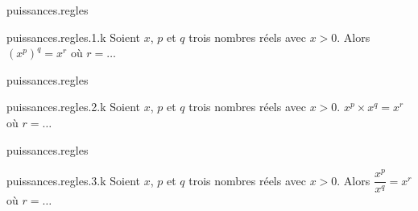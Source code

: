 \begin{qcm}{puissances.regles}
    \begin{question}{puissances.regles.1.k}
         Soient \(x\), \(p\) et \(q\) trois nombres réels avec \(x>0\). Alors \({\left(x^p\right)}^q=x^r\) où \(r=\ldots\)
         \vspace{-1.5ex}
         \begin{multicols}{3}
         \begin{reponses}
              \lastchoices
              
              \phantom{foo}
         \end{reponses}
        \end{multicols}
    \end{question}
\end{qcm}

\begin{qcm}{puissances.regles}
    \begin{question}{puissances.regles.2.k}
         Soient \(x\), \(p\) et \(q\) trois nombres réels avec \(x>0\). \(x^p \times x^q=x^r\) où \(r=\ldots\)
         \vspace{-1.5ex}
         \begin{multicols}{3}
         \begin{reponses}
              \lastchoices
              
              \phantom{foo}
         \end{reponses}
        \end{multicols}
    \end{question}
\end{qcm}

\begin{qcm}{puissances.regles}
    \begin{question}{puissances.regles.3.k}
         Soient \(x\), \(p\) et \(q\) trois nombres réels avec \(x>0\). Alors \(\dfrac{x^p}{x^q}=x^r\) où \(r=\ldots\)
         \vspace{-1.5ex}
         \begin{multicols}{3}
         \begin{reponses}
              \lastchoices
              
              \phantom{foo}
         \end{reponses}
        \end{multicols}
    \end{question}
\end{qcm}

